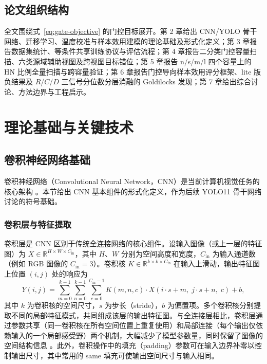 \documentclass[UTF8,openany,12pt]{ctexbook}
\begin{document}
\section{论文组织结构}
全文围绕式~\eqref{eq:gate-objective} 的门控目标展开。第 2 章给出 CNN/YOLO 骨干网络、迁移学习、温度校准与样本效用建模的理论基础及形式化定义；第 3 章报告数据集统计、等条件共享训练协议与评估流程；第 4 章报告二分类门控容量扫描、六类源域辅助视图及跨视图目标错位；第 5 章报告 n/s/m/l 四个容量上的 HN 比例全量扫描与跨容量验证；第 6 章报告门控导向样本效用评分框架、lite 版负结果及 $R$/$C$/$D$ 三信号分位数分层消融的 Goldilocks 发现；第 7 章给出综合讨论、方法边界与工程启示。

\chapter{理论基础与关键技术}

\section{卷积神经网络基础}
卷积神经网络（Convolutional Neural Network，CNN）是当前计算机视觉任务的核心架构 \cite{goodfellow2016deep,lecun1998gradient}。本节给出 CNN 基本组件的形式化定义，作为后续 YOLO11 骨干网络讨论的符号基础。

\subsection{卷积层与特征提取}
卷积层是 CNN 区别于传统全连接网络的核心组件。设输入图像（或上一层的特征图）为 $X \in \mathbb{R}^{H \times W \times C_{\mathrm{in}}}$，其中 $H$、$W$ 分别为空间高度和宽度，$C_{\mathrm{in}}$ 为输入通道数（例如 RGB 图像的 $C_{\mathrm{in}}=3$）。卷积核 $K \in \mathbb{R}^{k \times k \times C_{\mathrm{in}}}$ 在输入上滑动，输出特征图上位置 $(i,j)$ 处的响应为
\begin{equation}
Y(i,j) = \sum_{m=0}^{k-1}\sum_{n=0}^{k-1}\sum_{c=0}^{C_{\mathrm{in}}-1} K(m,n,c) \cdot X(i \cdot s + m,\; j \cdot s + n,\; c) + b,
\end{equation}
其中 $k$ 为卷积核的空间尺寸，$s$ 为步长（stride），$b$ 为偏置项。多个卷积核分别提取不同的局部特征模式，共同组成该层的输出特征图。与全连接层相比，卷积层通过参数共享（同一卷积核在所有空间位置上重复使用）和局部连接（每个输出仅依赖输入的一个局部感受野）两个机制，大幅减少了模型参数量，同时保留了图像的空间结构信息 \cite{lecun1998gradient}。此外，卷积操作中的填充（padding）参数可在输入边界补零以控制输出尺寸，其中常用的 same 填充可使输出空间尺寸与输入相同。
\end{document}
